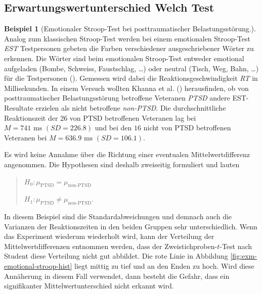 \documentclass[
]{book}
\theoremstyle{definition}
\theoremstyle{definition}
\newtheorem{example}{Beispiel}[chapter]
\theoremstyle{definition}
\theoremstyle{definition}
\theoremstyle{remark}
\begin{document}
\subsection{Erwartungswertunterschied Welch Test}\label{erwartungswertunterschied-welch-test}

\begin{example}[Emotionaler Stroop-Test bei posttraumatischer Belastungsstörung.]
\protect\hypertarget{exm:emotional-stroop}{}\label{exm:emotional-stroop}Analog zum klassischen Stroop-Test werden bei einem emotionalen Stroop-Test \emph{EST} Testpersonen gebeten die Farben verschiedener ausgeschriebener Wörter zu erkennen. Die Wörter sind beim emotionalen Stroop-Test entweder emotional aufgeladen (Bombe, Schweiss, Faustschlag, \ldots) oder neutral (Tisch, Weg, Bahn, \ldots) für die Testpersonen (). Gemessen wird dabei die Reaktionsgeschwindigkeit \emph{RT} in Millisekunden. In einem Versuch wollten Khanna et al. () herausfinden, ob von posttraumatischer Belastungsstörung betroffene Veteranen \emph{PTSD} andere EST-Resultate erzielen als nicht betroffene \emph{non-PTSD}. Die durchschnittliche Reaktionszeit der \(26\) von PTSD betroffenen Veteranen lag bei \(M=741\text{ ms }(SD = 226.8)\) und bei den \(16\) nicht von PTSD betroffenen Veteranen bei \(M=636.9 \text{ ms }(SD = 106.1)\).
\end{example}

Es wird keine Annahme über die Richtung einer eventualen Mittelwertdifferenz angenommen. Die Hypothesen sind deshalb zweiseitig formuliert und lauten

\begin{quote}
\(H_0: \mu_\text{PTSD} = \mu_\text{non-PTSD}\)

\(H_1: \mu_\text{PTSD} \neq \mu_\text{non-PTSD}.\)
\end{quote}

In diesem Beispiel sind die Standardabweichungen und demnach auch die Varianzen der Reaktionszeiten in den beiden Gruppen sehr unterschiedlich. Wenn das Experiment wiederum wiederholt wird, kann der Verteilung der Mittelwertdifferenzen entnommen werden, dass der Zweistichproben-\(t\)-Test nach Student diese Verteilung nicht gut abbildet. Die rote Linie in Abbildung \ref{fig:exm-emotional-stroop-hist} liegt mittig zu tief und an den Enden zu hoch. Wird diese Annäherung in diesem Fall verwendet, dann besteht die Gefahr, dass ein signifikanter Mittelwertunterschied nicht erkannt wird.
\end{document}
